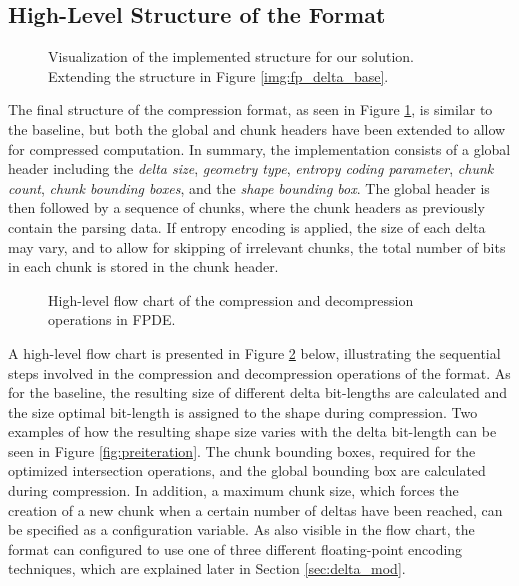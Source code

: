 \subsection{High-Level Structure of the Format}

\begin{figure}[htbp]
    \centering
    
    \caption{Visualization of the implemented structure for our solution. Extending the structure in Figure \ref{img:fp_delta_base}.}
    \label{img:fpde_structure}
\end{figure}

The final structure of the compression format, as seen in Figure \ref{img:fpde_structure}, is similar to the baseline, but both the global and chunk headers have been extended to allow for compressed computation. In summary, the implementation consists of a global header including the \emph{delta size}, \emph{geometry type}, \emph{entropy coding parameter}, \emph{chunk count}, \emph{chunk bounding boxes}, and the \emph{shape bounding box}. The global header is then followed by a sequence of chunks, where the chunk headers as previously contain the parsing data. If entropy encoding is applied, the size of each delta may vary, and to allow for skipping of irrelevant chunks, the total number of bits in each chunk is stored in the chunk header.

\begin{figure}[htbp]
    \centering
    \hspace*{0.5cm} 
    
    \caption{High-level flow chart of the compression and decompression operations in FPDE.}
    \label{fig:flow_chart}
\end{figure}


A high-level flow chart is presented in Figure \ref{fig:flow_chart} below, illustrating the sequential steps involved in the compression and decompression operations of the format. As for the baseline, the resulting size of different delta bit-lengths are calculated and the size optimal bit-length is assigned to the shape during compression. Two examples of how the resulting shape size varies with the delta bit-length can be seen in Figure \ref{fig:preiteration}. The chunk bounding boxes, required for the optimized intersection operations, and the global bounding box are calculated during compression. In addition, a maximum chunk size, which forces the creation of a new chunk when a certain number of deltas have been reached, can be specified as a configuration variable. As also visible in the flow chart, the format can configured to use one of three different floating-point encoding techniques, which are explained later in Section \ref{sec:delta_mod}.

